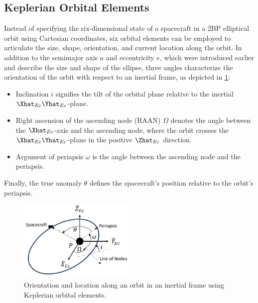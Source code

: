 \subsection{Keplerian Orbital Elements}
Instead of specifying the six-dimensional state of a spacecraft in a 2BP elliptical orbit using
Cartesian coordinates, six orbital elements can be employed to articulate the size, shape,
orientation, and current location along the orbit. In addition to the semimajor axis $a$ and
eccentricity $e$, which were introduced earlier and describe the size and shape of the ellipse,
three angles characterize the orientation of the orbit with respect to an inertial frame, as
depicted in \cref{fig:orbitalElements}:
\begin{itemize}
    \item Inclination $i$ signifies the tilt of the orbital plane relative to the inertial
    $\Xhat_{Ec}\Yhat_{Ec}$-plane.
    \item Right ascension of the ascending node (RAAN) $\Omega$ denotes the angle between the
    $\Xhat_{Ec}$-axis and the ascending node, where the orbit crosses the
    $\Xhat_{Ec}\Yhat_{Ec}$-plane in the positive $\Zhat_{Ec}$ direction.
    \item Argument of periapsis $\omega$ is the angle between the ascending node and the periapsis.
\end{itemize}
Finally, the true anomaly $\theta$ defines the spacecraft's position relative to the orbit's
periapsis.

\begin{figure}[ht]
    \centering
    \includegraphics[width=0.5\textwidth]{figures/OrbitalElements.jpg}
    \caption{Orientation and location along an orbit in an inertial frame using Keplerian orbital elements.}
    \label{fig:orbitalElements}
\end{figure}

